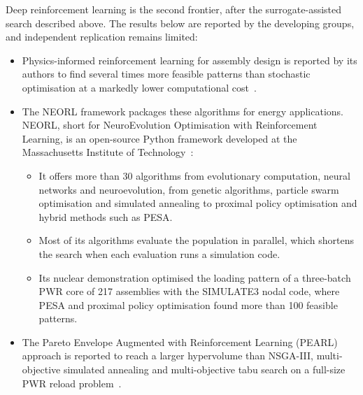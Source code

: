 Deep reinforcement learning is the second frontier, after the
surrogate-assisted search described above. The results below are
reported by the developing groups, and independent replication remains
limited:

\begin{itemize}
  \item Physics-informed reinforcement learning for assembly design is
        reported by its authors to find several times more feasible
        patterns than stochastic optimisation at a markedly lower
        computational cost~\cite{radaideh_2021_rl}.

  \item The NEORL framework packages these algorithms for energy
        applications. NEORL, short for NeuroEvolution Optimisation with
        Reinforcement Learning, is an open-source Python framework
        developed at the Massachusetts Institute of
        Technology~\cite{radaideh_2023_neorl}:

        \begin{itemize}
          \item It offers more than 30 algorithms from evolutionary
                computation, neural networks and neuroevolution, from
                genetic algorithms, particle swarm optimisation and
                simulated annealing to proximal policy optimisation and
                hybrid methods such as PESA.

          \item Most of its algorithms evaluate the population in
                parallel, which shortens the search when each evaluation
                runs a simulation code.

          \item Its nuclear demonstration optimised the loading pattern of
                a three-batch PWR core of 217 assemblies with the SIMULATE3
                nodal code, where PESA and proximal policy optimisation
                found more than 100 feasible patterns.
        \end{itemize}

  \item The Pareto Envelope Augmented with Reinforcement Learning (PEARL)
        approach is reported to reach a larger hypervolume than NSGA-III,
        multi-objective simulated annealing and multi-objective tabu
        search on a full-size PWR reload
        problem~\cite{seurin_2024_pearl}.
\end{itemize}

